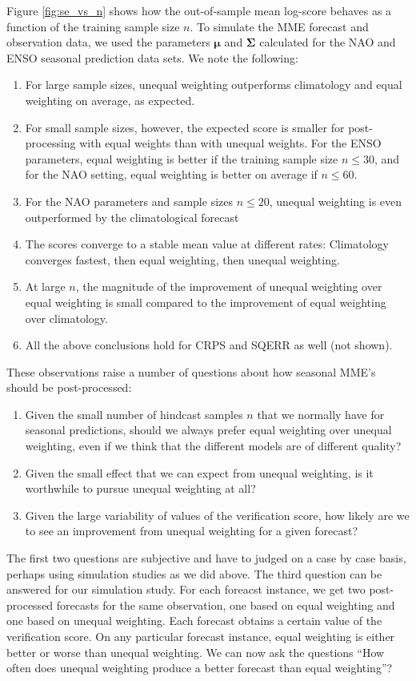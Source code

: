 \documentclass[12pt]{article}
\renewcommand{\vec}[1]{\bm{#1}}
\newcommand{\mat}[1]{\bm{#1}}
\begin{document}
Figure \ref{fig:se_vs_n} shows how the out-of-sample mean log-score behaves as a function of the training sample size $n$.
To simulate the MME forecast and observation data, we used the parameters $\vec{\mu}$ and $\mat{\Sigma}$ calculated for the NAO and ENSO seasonal prediction data sets.
We note the following:
%
\begin{enumerate}
\item For large sample sizes, unequal weighting outperforms climatology and equal weighting on average, as expected.
\item For small sample sizes, however, the expected score is smaller for post-processing with equal weights than with unequal weights.
For the ENSO parameters, equal weighting is better if the training sample size $n\le30$, and for the NAO setting, equal weighting is better on average if $n\le 60$.
\item For the NAO parameters and sample sizes $n \le 20$, unequal weighting is even outperformed by the climatological forecast  
\item The scores converge to a stable mean value at different rates: Climatology converges fastest, then equal weighting, then unequal weighting.
\item At large $n$, the magnitude of the improvement of unequal weighting over equal weighting is small compared to the improvement of equal weighting over climatology.
\item All the above conclusions hold for CRPS and SQERR as well (not shown). 
\end{enumerate}


These observations raise a number of questions about how seasonal MME's should be post-processed:
\begin{enumerate}
\item Given the small number of hindcast samples $n$ that we normally have for seasonal predictions, should we always prefer equal weighting over unequal weighting, even if we think that the different models are of different quality?
\item Given the small effect that we can expect from unequal weighting, is it worthwhile to pursue unequal weighting at all?
\item Given the large variability of values of the verification score, how likely are we to see an improvement from unequal weighting for a given forecast?
\end{enumerate}


The first two questions are subjective and have to judged on a case by case basis, perhaps using simulation studies as we did above.
The third question can be answered for our simulation study.
For each foreacst instance, we get two post-processed forecasts for the same observation, one based on equal weighting and one based on unequal weighting.
Each forecast obtains a certain value of the verification score.
On any particular forecast instance, equal weighting is either better or worse than unequal weighting.
We can now ask the questions ``How often does unequal weighting produce a better forecast than equal weighting''?
\end{document}
